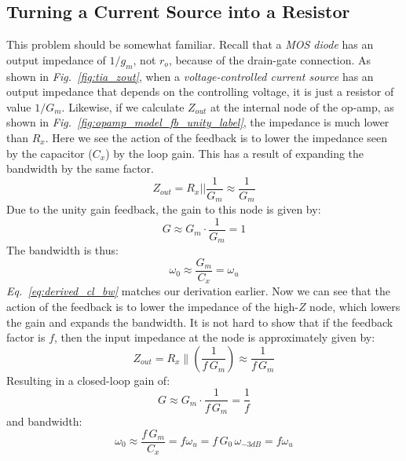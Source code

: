 \subsection{Turning a Current Source into a Resistor}
This problem should be somewhat familiar.  Recall that a \textit{MOS diode} has an output impedance of $1/g_m$, not $r_o$, because of the drain-gate connection.  As shown in \emph{Fig.~\ref{fig:tia_zout}}, when a \textit{voltage-controlled current source} has an output impedance that depends on the controlling voltage, it is just a resistor of value $1/G_m$.  Likewise, if we calculate $Z_{out}$ at the internal node of the op-amp, as shown in \emph{Fig.~\ref{fig:opamp_model_fb_unity_label}}, the impedance is much lower than $R_x$.  Here we see the action of the feedback is to lower the impedance seen by the capacitor ($C_x$) by the loop gain.  This has a result of expanding the bandwidth by the same factor.
    \begin{equation}
        Z_{out} = R_x || \frac{1}{G_m} \approx \frac{1}{G_m}
    \end{equation}
Due to the unity gain feedback, the gain to this node is given by:
    \begin{equation}
        G \approx G_m \cdot \frac{1}{G_m} = 1
    \end{equation}
The bandwidth is thus:
    \begin{equation}
        \omega_0 \approx \frac{G_m}{C_x } = \omega_u
        \label{eq:derived_cl_bw}
    \end{equation}
\emph{Eq.~\ref{eq:derived_cl_bw}} matches our derivation earlier.  Now we can see that the action of the feedback is to lower the impedance of the high-$Z$ node, which lowers the gain and expands the bandwidth. It is not hard to show that if the feedback factor is $f$, then the input impedance at the node is approximately given by:
    \begin{equation}
        Z_{out} = R_x \parallel \left(\frac{1}{f\,G_m}\right) \approx \frac{1}{f\,G_m}
    \end{equation}
Resulting in a closed-loop gain of:
    \begin{equation}
        G \approx G_m \cdot \frac{1}{f\,G_m} = \frac{1}{f}
    \end{equation}
and bandwidth:
    \begin{equation}
        \omega_0 \approx \frac{f\,G_m}{C_x} = f\omega_u  = f\,G_0\,\omega_{-3dB} = f\omega_u
    \end{equation}

